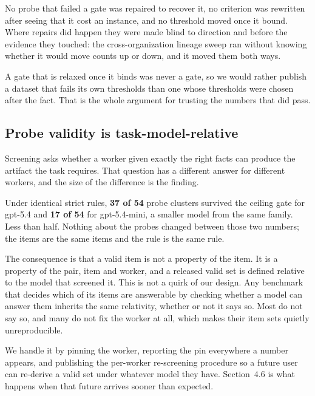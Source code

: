 \documentclass[11pt]{article}
\begin{document}
No probe that failed a gate was repaired to recover it, no criterion was
rewritten after seeing that it cost an instance, and no threshold moved once it
bound. Where repairs did happen they were made blind to direction and before the
evidence they touched: the cross-organization lineage sweep ran without knowing
whether it would move counts up or down, and it moved them both ways.

A gate that is relaxed once it binds was never a gate, so we would rather publish
a dataset that fails its own thresholds than one whose thresholds were chosen
after the fact. That is the whole argument for trusting the numbers that did
pass.

\subsection{Probe validity is task-model-relative}

Screening asks whether a worker given exactly the right facts can produce the
artifact the task requires. That question has a different answer for different
workers, and the size of the difference is the finding.

Under identical strict rules, \textbf{37 of 54} probe clusters survived the
ceiling gate for gpt-5.4 and \textbf{17 of 54} for gpt-5.4-mini, a smaller model
from the same family. Less than half. Nothing about the probes changed between
those two numbers; the items are the same items and the rule is the same rule.

The consequence is that a valid item is not a property of the item. It is a
property of the pair, item and worker, and a released valid set is defined
relative to the model that screened it. This is not a quirk of our design. Any
benchmark that decides which of its items are answerable by checking whether a
model can answer them inherits the same relativity, whether or not it says so.
Most do not say so, and many do not fix the worker at all, which makes their item
sets quietly unreproducible.

We handle it by pinning the worker, reporting the pin everywhere a number
appears, and publishing the per-worker re-screening procedure so a future user
can re-derive a valid set under whatever model they have. Section~4.6 is what
happens when that future arrives sooner than expected.
\end{document}
